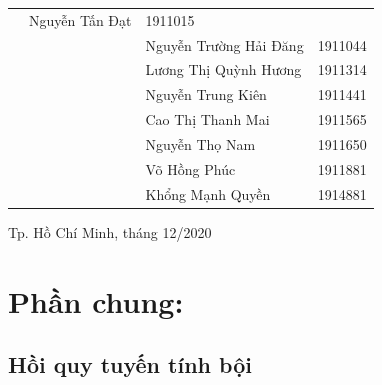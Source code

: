 \documentclass[a4paper]{article}
\theoremstyle{definition}
\begin{document}
\begin{titlepage}
\begin{table}[h]
\begin{tabular}{rrll}
& Nguyễn Tấn Đạt & 1911015 \\
&& Nguyễn Trường Hải Đăng & 1911044 \\
&& Lương Thị Quỳnh Hương & 1911314\\
&&Nguyễn Trung Kiên  & 1911441\\
&& Cao Thị Thanh Mai  &     1911565\\
&& Nguyễn Thọ Nam	 & 1911650\\
&& Võ Hồng Phúc & 1911881\\
&& Khổng Mạnh Quyền & 1914881 \\



\end{tabular}
\end{table}
\vspace{1.5cm}
\begin{center}
{\footnotesize Tp. Hồ Chí Minh, tháng 12/2020}
\end{center}
\end{titlepage}



\newpage
\tableofcontents
\newpage


\section{Phần chung:}
\subsection{Hồi quy tuyến tính bội}\label{code}
\end{document}
